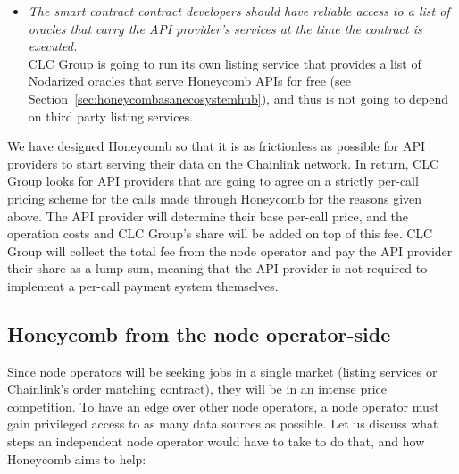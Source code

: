 \documentclass[12pt]{article}
\begin{document}
\begin{itemize}
	\item \textit{The smart contract contract developers should have reliable access to a list of oracles that carry the API provider’s services at the time the contract is executed.}\medskip\\
	CLC Group is going to run its own listing service that provides a list of Nodarized oracles that serve Honeycomb APIs for free (see Section~\ref{sec:honeycombasanecosystemhub}), and thus is not going to depend on third party listing services.
\end{itemize}

We have designed Honeycomb so that it is as frictionless as possible for API providers to start serving their data on the Chainlink network.
In return, CLC Group looks for API providers that are going to agree on a strictly per-call pricing scheme for the calls made through Honeycomb for the reasons given above.
The API provider will determine their base per-call price, and the operation costs and CLC Group’s share will be added on top of this fee.
CLC Group will collect the total fee from the node operator and pay the API provider their share as a lump sum, meaning that the API provider is not required to implement a per-call payment system themselves.

\subsection{Honeycomb from the node operator-side}
\label{sec:honeycombfromthenodeoperatorside}

Since node operators will be seeking jobs in a single market (listing services or Chainlink's order matching contract), they will be in an intense price competition.
To have an edge over other node operators, a node operator must gain privileged access to as many data sources as possible.
Let us discuss what steps an independent node operator would have to take to do that, and how Honeycomb aims to help:
\end{document}
